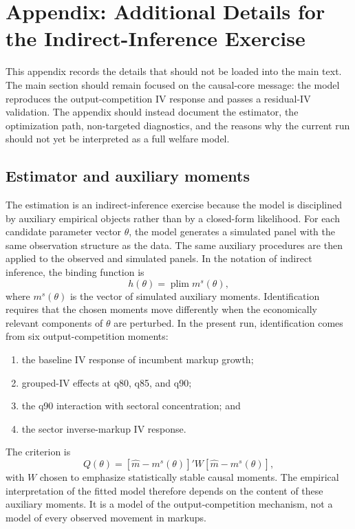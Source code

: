 \documentclass[11pt,a4paper]{article}
\begin{document}
\appendix
\section{Appendix: Additional Details for the Indirect-Inference Exercise}

This appendix records the details that should not be loaded into the main text. The main section should remain focused on the causal-core message: the model reproduces the output-competition IV response and passes a residual-IV validation. The appendix should instead document the estimator, the optimization path, non-targeted diagnostics, and the reasons why the current run should not yet be interpreted as a full welfare model.

\subsection{Estimator and auxiliary moments}

The estimation is an indirect-inference exercise because the model is disciplined by auxiliary empirical objects rather than by a closed-form likelihood. For each candidate parameter vector \(\theta\), the model generates a simulated panel with the same observation structure as the data. The same auxiliary procedures are then applied to the observed and simulated panels. In the notation of indirect inference, the binding function is
\begin{equation}
    h(\theta)=\operatorname{plim} m^{s}(\theta),
\end{equation}
where \(m^{s}(\theta)\) is the vector of simulated auxiliary moments. Identification requires that the chosen moments move differently when the economically relevant components of \(\theta\) are perturbed. In the present run, identification comes from six output-competition moments:
\begin{enumerate}
    \item the baseline IV response of incumbent markup growth;
    \item grouped-IV effects at q80, q85, and q90;
    \item the q90 interaction with sectoral concentration; and
    \item the sector inverse-markup IV response.
\end{enumerate}
The criterion is
\begin{equation}
Q(\theta)=\left[\widehat m-m^{s}(\theta)\right]'W
\left[\widehat m-m^{s}(\theta)\right],
\end{equation}
with \(W\) chosen to emphasize statistically stable causal moments. The empirical interpretation of the fitted model therefore depends on the content of these auxiliary moments. It is a model of the output-competition mechanism, not a model of every observed movement in markups.
\end{document}
